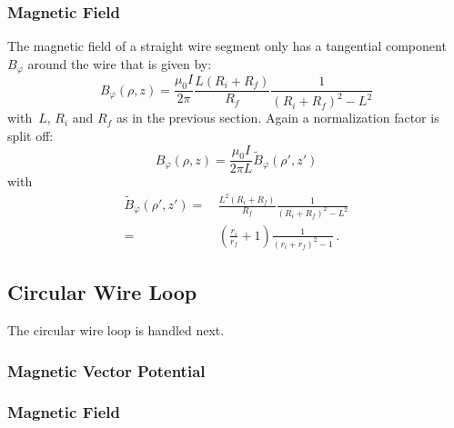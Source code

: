 \subsubsection{Magnetic Field}
The magnetic field of a straight wire segment
only has a tangential component~$B_\varphi$ around the wire that is given by:
\begin{equation}
  B_\varphi(\rho, z) = \frac{\mu_0 I}{2 \pi} \frac{L(R_i + R_f)}{R_f} \frac{1}{\left(R_i + R_f\right)^2 - L^2}
\end{equation}
with~$L$, $R_i$ and $R_f$ as in the previous section.
Again a normalization factor is split off:
\begin{equation}
  B_\varphi(\rho, z) = \frac{\mu_0 I}{2 \pi L} \tilde{B}_\varphi(\rho', z')
\end{equation}
with
\begin{align}
  \tilde{B}_\varphi(\rho', z')
  =&\, \frac{L^2(R_i + R_f)}{R_f} \frac{1}{\left(R_i + R_f\right)^2 - L^2} \nonumber \\
  =&\, \left(\frac{r_i}{r_f} + 1\right) \frac{1}{\left(r_i + r_f\right)^2 - 1} \, .
\end{align}









\subsection{Circular Wire Loop}
The circular wire loop is handled next.

\subsubsection{Magnetic Vector Potential}


\subsubsection{Magnetic Field}


